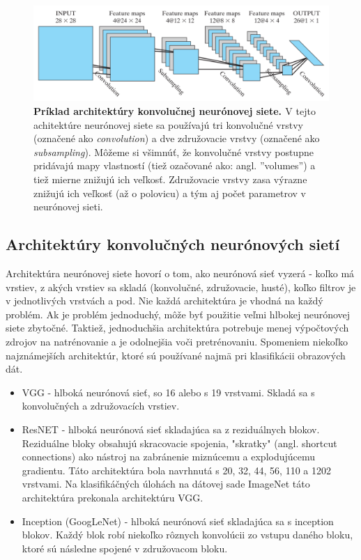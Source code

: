 \begin{figure}[h!]
    \centering
    \includegraphics[width=12cm]{assets/images/conv_net_architecture.png}
    \caption{\textbf{Príklad architektúry konvolučnej neurónovej siete. \cite{haykin2009neural}} V tejto achitektúre neurónovej siete sa používajú tri konvolučné vrstvy (označené ako \textit{convolution}) a dve združovacie vrstvy (označené ako \textit{subsampling}). Môžeme si všimnúť, že konvolučné vrstvy postupne pridávajú mapy vlastností (tiež ozačované ako: angl. ''volumes'') a tiež mierne znižujú ich veľkosť. Združovacie vrstvy zasa výrazne znižujú ich veľkosť (až o polovicu) a tým aj počet parametrov v neurónovej sieti.}
    \label{fig:conv_net_architecture}
\end{figure}

\subsection{Architektúry konvolučných neurónových sietí}

Architektúra neurónovej siete hovorí o tom, ako neurónová sieť vyzerá - koľko má vrstiev, z akých vrstiev sa skladá (konvolučné, združovacie, husté), koľko filtrov je v jednotlivých vrstvách a pod. Nie každá architektúra je vhodná na každý problém. Ak je problém jednoduchý, môže byť použitie veľmi hlbokej neurónovej siete zbytočné. Taktiež, jednoduchšia architektúra potrebuje menej výpočtových zdrojov na natrénovanie a je odolnejšia voči pretrénovaniu. Spomeniem niekoľko najznámejších architektúr, ktoré sú používané najmä pri klasifikácii obrazových dát.

\begin{itemize}
    \item VGG \cite{simonyan2014very} - hlboká neurónová sieť, so 16 alebo s 19 vrstvami. Skladá sa s konvolučných a združovacích vrstiev.
    \item ResNET \cite{he2016deep} - hlboká neurónová sieť skladajúca sa z reziduálnych blokov. Reziduálne bloky obsahujú skracovacie spojenia, "skratky" (angl. shortcut connections) ako nástroj na zabránenie miznúcemu a explodujúcemu gradientu. Táto architektúra bola navrhnutá s 20, 32, 44, 56, 110 a 1202 vrstvami. Na klasifikáčných úlohách na dátovej sade ImageNet táto architektúra prekonala architektúru VGG.
    \item Inception (GoogLeNet) \cite{szegedy2015going} - hlboká neurónová sieť skladajúca sa s inception blokov. Každý blok robí niekoľko rôznych konvolúcii zo vstupu daného bloku, ktoré sú následne spojené v združovacom bloku.
\end{itemize}

